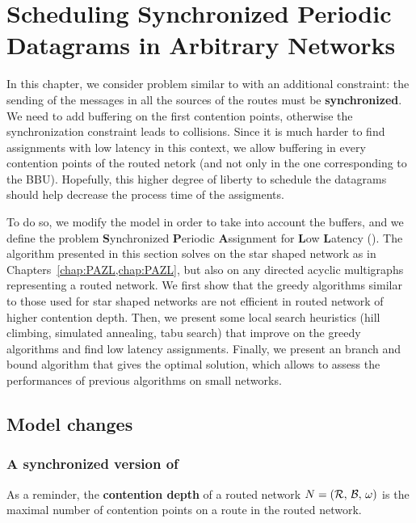 
\chapter{Scheduling Synchronized Periodic Datagrams in Arbitrary Networks }
\label{chap:SPALL}
\minitoc

In this chapter, we consider problem similar to \pall with an additional constraint: the sending of the messages in all the sources of the routes must be \textbf{synchronized}. We need to add buffering on the first contention points, otherwise the synchronization constraint leads to collisions. Since it is much harder to find assignments with low latency in this context,
we allow buffering in every contention points of the routed netork (and not only in the one corresponding to the BBU). Hopefully, this higher degree of liberty to schedule the datagrams should help decrease the process time of the assigments.

To do so, we modify the model in order to take into account the buffers, and we define the problem \textbf{S}ynchronized \textbf{P}eriodic \textbf{A}ssignment for \textbf{L}ow \textbf{L}atency (\spall). The algorithm presented in this section solves \spall on the star shaped network as in Chapters~\ref{chap:PAZL,chap:PAZL}, but also on any directed acyclic multigraphs representing a routed network. We first show that the greedy algorithms similar to those used for star shaped networks are not efficient in routed network of higher contention depth. Then, we present some local search heuristics (hill climbing, simulated annealing, tabu search) that improve on the greedy algorithms and find low latency assignments. Finally, we present an \FPT branch and bound algorithm that gives the optimal solution, which allows to assess the performances of previous algorithms on small networks.


\section{Model changes}
\subsection{A synchronized version of \pall}

As a reminder, the \textbf{contention depth} of a routed network $N = ({\cal R},\,{\cal B},\,\omega)$ is the maximal number of contention points on a route in the routed network. 

